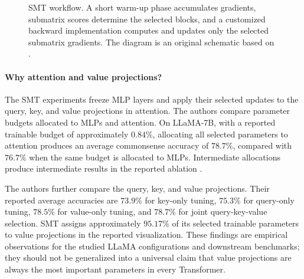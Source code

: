\begin{figure}[htbp]
    \centering
    
    \caption{SMT workflow. A short warm-up phase accumulates gradients,
    submatrix scores determine the selected blocks, and a customized
    backward implementation computes and updates only the selected
    submatrix gradients. The diagram is an original schematic based on
    \textcite{he2025smt}.}
    \label{fig:smt-workflow}
\end{figure}

\paragraph{Why attention and value projections?}
The SMT experiments freeze MLP layers and apply their selected updates to
the query, key, and value projections in attention. The authors compare
parameter budgets allocated to MLPs and attention. On LLaMA-7B, with a
reported trainable budget of approximately $0.84\%$, allocating all selected
parameters to attention produces an average commonsense accuracy of
$78.7\%$, compared with $76.7\%$ when the same budget is allocated to MLPs.
Intermediate allocations produce intermediate results in the reported
ablation \parencite{he2025smt}.

The authors further compare the query, key, and value projections. Their
reported average accuracies are $73.9\%$ for key-only tuning, $75.3\%$ for
query-only tuning, $78.5\%$ for value-only tuning, and $78.7\%$ for joint
query-key-value selection. SMT assigns approximately $95.17\%$ of its
selected trainable parameters to value projections in the reported
visualization. These findings are empirical observations for the studied
LLaMA configurations and downstream benchmarks; they should not be
generalized into a universal claim that value projections are always the
most important parameters in every Transformer.

